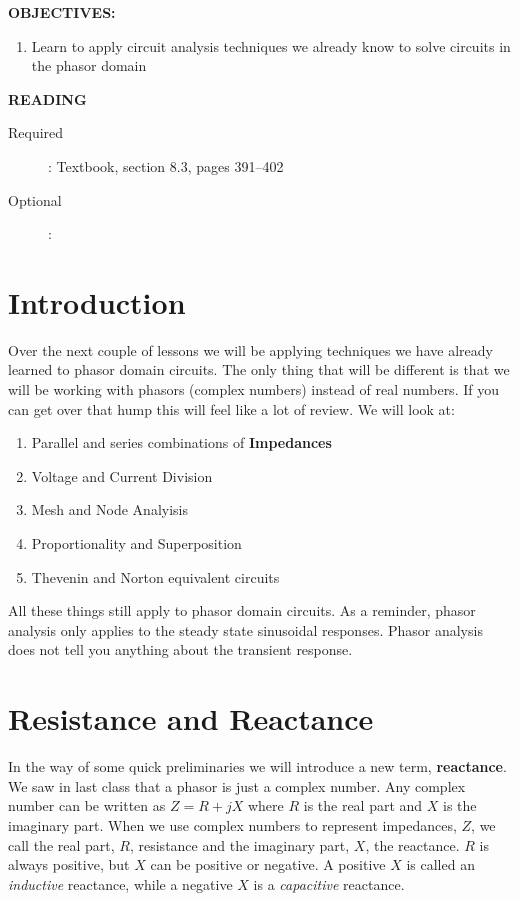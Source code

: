 \documentclass{handout}
\begin{document}
\maketitle

\textbf{OBJECTIVES:}
\begin{enumerate}
\item Learn to apply circuit analysis techniques we already know to solve circuits in the phasor domain
\end{enumerate}

\textbf{READING}
\begin{description}
\item [Required]:
Textbook, section 8.3, pages 391--402
\item [Optional]:
\end{description}

\section{Introduction}
Over the next couple of lessons we will be applying techniques we have already learned to phasor domain circuits.  The only thing that will be different is that we will be working with phasors (complex numbers) instead of real numbers.  If you can get over that hump this will feel like a lot of review.  We will look at:
\begin{enumerate}
\item Parallel and series combinations of \textbf{Impedances}
\item Voltage and Current Division
\item Mesh and Node Analyisis
\item Proportionality and Superposition
\item Thevenin and Norton equivalent circuits
\end{enumerate}

All these things still apply to phasor domain circuits. As a reminder, phasor analysis only applies to the steady state sinusoidal responses.  Phasor analysis does not tell you anything about the transient response.

\section{Resistance and Reactance}
In the way of some quick preliminaries we will introduce a new term, \textbf{reactance}.  We saw in last class that a phasor is just a complex number.  Any complex number can be written as $Z = R +jX$ where $R$ is the real part and $X$ is the imaginary part.  When we use complex numbers to represent impedances, $Z$, we call the real part, $R$, resistance and the imaginary part, $X$, the reactance.  $R$ is always positive, but $X$ can be positive or negative. A positive $X$ is called an {\em inductive} reactance, while a negative $X$ is a {\em capacitive} reactance.
\end{document}
